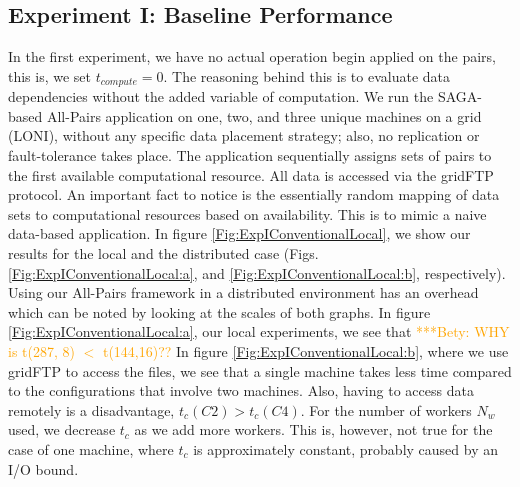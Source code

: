 \documentclass{rspublic}
\newcommand{\betynote}[1]{ {\textcolor{orange} { ***Bety: #1 }}}
\begin{document}
\subsection{Experiment I: Baseline Performance}
 In the first experiment, we have no actual operation begin applied on
the pairs, this is, we set $t_{compute}=0$. The reasoning behind this is to
evaluate data dependencies without the added variable of computation.
We run the SAGA-based All-Pairs application on one, two, and three
unique machines on a grid (LONI), without any specific data placement
strategy; also, no replication or fault-tolerance takes place. The
application sequentially assigns sets of pairs to the first available
computational resource. All data is accessed via the gridFTP protocol.
An important fact to notice is the essentially random mapping of data
sets to computational resources based on availability. This is to mimic
a naive data-based application. In figure
\ref{Fig:ExpIConventionalLocal}, we show our results for the local and the 
distributed case (Figs. \ref{Fig:ExpIConventionalLocal:a}, and
\ref{Fig:ExpIConventionalLocal:b}, respectively). Using our All-Pairs framework in a distributed environment has an overhead which can be noted by looking at the scales of both graphs. In figure
\ref{Fig:ExpIConventionalLocal:a}, our local experiments, we see that
\betynote{WHY is t(287, 8) $<$ t(144,16)??} 
In figure \ref{Fig:ExpIConventionalLocal:b}, where we use gridFTP 
to access the files, we see that a single 
machine takes less time compared to the configurations that
involve two machines. Also, having to access data remotely is a
disadvantage, $t_c(C2) > t_c(C4)$. For the number of workers $N_w$ used, we decrease $t_c$ as we add more workers. This is, however, not true for the case of one machine, where $t_c$ is approximately constant, probably caused by an I/O bound.
\end{document}
